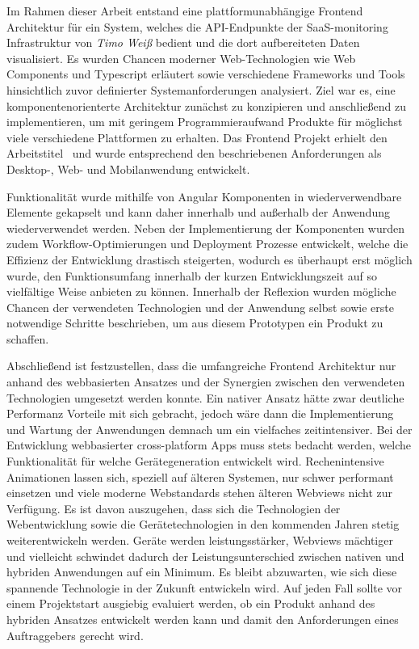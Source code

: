Im Rahmen dieser Arbeit entstand eine plattformunabhängige Frontend Architektur für ein System,
welches die API-Endpunkte der SaaS-monitoring Infrastruktur von \emph{Timo Weiß} bedient und die dort aufbereiteten Daten visualisiert.
Es wurden Chancen moderner Web-Technologien wie Web Components und Typescript erläutert
sowie verschiedene Frameworks und Tools hinsichtlich zuvor definierter Systemanforderungen analysiert.
Ziel war es, eine komponentenorienterte Architektur zunächst zu konzipieren und anschließend zu implementieren, um
mit geringem Programmieraufwand Produkte für möglichst viele verschiedene Plattformen zu erhalten.
Das Frontend Projekt erhielt den Arbeitstitel \projectname{} und wurde entsprechend den beschriebenen Anforderungen
als Desktop-, Web- und Mobilanwendung entwickelt.

Funktionalität wurde mithilfe von Angular Komponenten in wiederverwendbare
Elemente gekapselt und kann daher innerhalb und außerhalb der Anwendung wiederverwendet werden.
Neben der Implementierung der Komponenten wurden zudem Workflow-Optimierungen und Deployment Prozesse entwickelt,
welche die Effizienz der Entwicklung drastisch steigerten, wodurch es überhaupt erst möglich wurde, den Funktionsumfang
innerhalb der kurzen Entwicklungszeit auf so vielfältige Weise anbieten zu können.
Innerhalb der Reflexion wurden mögliche Chancen der verwendeten Technologien und der Anwendung selbst
sowie erste notwendige Schritte beschrieben, um aus diesem
Prototypen ein Produkt zu schaffen.

Abschließend ist festzustellen, dass die umfangreiche Frontend Architektur nur anhand des webbasierten Ansatzes und der Synergien zwischen den verwendeten Technologien umgesetzt werden konnte.
Ein nativer Ansatz hätte zwar deutliche Performanz Vorteile mit sich gebracht, jedoch wäre dann die Implementierung und Wartung der Anwendungen demnach um ein vielfaches zeitintensiver.
Bei der Entwicklung webbasierter cross-platform Apps muss stets bedacht werden, welche Funktionalität für welche Gerätegeneration entwickelt wird.
Rechenintensive Animationen lassen sich, speziell auf älteren Systemen, nur schwer performant einsetzen und viele moderne Webstandards stehen älteren Webviews nicht zur Verfügung.
Es ist davon auszugehen, dass sich die Technologien der Webentwicklung sowie die Gerätetechnologien in den kommenden Jahren stetig weiterentwickeln werden.
Geräte werden leistungsstärker, Webviews mächtiger und vielleicht schwindet dadurch der Leis­tungs­un­ter­schied zwischen nativen und hybriden Anwendungen auf ein Minimum.
Es bleibt abzuwarten, wie sich diese spannende Technologie in der Zukunft entwickeln wird.
Auf jeden Fall sollte vor einem Projektstart ausgiebig evaluiert werden,
ob ein Produkt anhand des hybriden Ansatzes entwickelt werden kann und damit den Anforderungen eines Auftraggebers gerecht wird.
